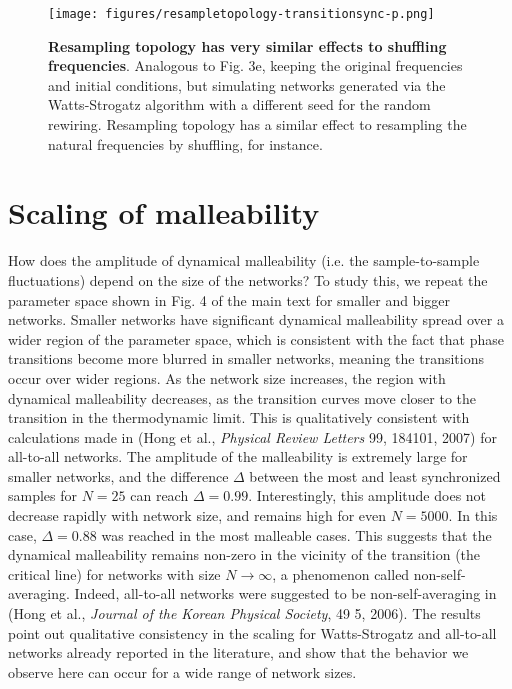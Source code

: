 \documentclass[reprint,onecolumn,superscriptaddress,showpacs,amsmath,amssymb,aps,prx,floatfix,]{revtex4-2}
\begin{document}
\begin{figure}[htb]
    \centering
    \texttt{[image: figures/resampletopology-transitionsync-p.png]}
    \caption{\textbf{Resampling topology has very similar effects to shuffling frequencies}. Analogous to Fig. 3e, keeping the original frequencies and initial conditions, but simulating networks generated via the Watts-Strogatz algorithm with a different seed for the random rewiring. Resampling topology has a similar effect to resampling the natural frequencies by shuffling, for instance.}
    \label{sup:fig:transitionresamplingtop}
\end{figure}


\section{Scaling of malleability}
How does the amplitude of dynamical malleability (i.e. the sample-to-sample fluctuations) depend on the size of the networks? To study this, we repeat the parameter space shown in Fig. 4 of the main text for smaller and bigger networks. Smaller networks have significant dynamical malleability spread over a wider region of the parameter space, which is consistent with the fact that phase transitions become more blurred in smaller networks, meaning the transitions occur over wider regions. As the network size increases, the region with dynamical malleability decreases, as the transition curves move closer to the transition in the thermodynamic limit. This is qualitatively consistent with calculations made in (Hong et al., \textit{Physical Review Letters} 99, 184101, 2007) for all-to-all networks. The amplitude of the malleability is extremely large for smaller networks, and the difference $\Delta$ between the most and least synchronized samples for $N = 25$ can reach $\Delta = 0.99$. Interestingly, this amplitude does not decrease rapidly with network size, and remains high for even $N = 5000$. In this case, $\Delta = 0.88$ was reached in the most malleable cases.  This suggests that the dynamical malleability remains non-zero in the vicinity of the transition (the critical line) for networks with size $N\to\infty$, a phenomenon called non-self-averaging. Indeed, all-to-all networks were suggested to be non-self-averaging in (Hong et al., \textit{Journal of the Korean Physical Society}, 49 5, 2006). The results point out qualitative consistency in the scaling for Watts-Strogatz and all-to-all networks already reported in the literature, and show that the behavior we observe here can occur for a wide range of network sizes.
\end{document}
